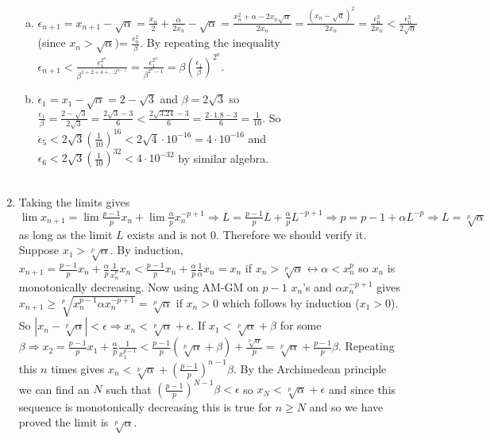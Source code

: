 \documentclass{article}
\begin{document}
\begin{enumerate}
\begin{enumerate}[(a)]
\item $\epsilon_{n+1}=x_{n+1}-\sqrt{\alpha}=\displaystyle\frac{x_n}{2}+\frac{\alpha}{2x_n}-\sqrt{\alpha}=\frac{x_n^2+\alpha-2x_n\sqrt{\alpha}}{2x_n}=\frac{(x_n-\sqrt{a})^2}{2x_n}=\frac{\epsilon_n^2}{2x_n}<\frac{\epsilon_n^2}{2\sqrt{\alpha}}$ (since $x_n > \sqrt{\alpha}) $= $\displaystyle\frac{\epsilon_n^2}{\beta}$. By repeating the inequality $\epsilon_{n+1} < \displaystyle \frac{\epsilon_1^{2^n}}{\beta^{1+2+4+...2^{n-1}}}=\displaystyle \frac{\epsilon_1^{2^n}}{\beta^{2^n-1}}=\beta\left(\frac{\epsilon_1}{\beta}\right)^{2^n}$.
\item $\epsilon_1 = x_1 - \sqrt{\alpha} = 2 - \sqrt{3}$ and $\beta = 2\sqrt{3}$ so $\displaystyle\frac{\epsilon_1}{\beta}=\frac{2 - \sqrt{3}}{2\sqrt{3}}=\frac{2\sqrt{3}-3}{6}<\frac{2\sqrt{3.24}-3}{6}=\frac{2\cdot 1.8 - 3}{6}=\frac{1}{10}$. So $\epsilon_5 < 2\sqrt{3}\left(\frac{1}{10}\right)^{16}<2\sqrt{4}\cdot 10^{-16}=4\cdot 10^{-16}$ and $\epsilon_6 < 2\sqrt{3}\left(\frac{1}{10}\right)^{32} < 4\cdot 10^{-32}$ by similar algebra.
\\
\\
\end{enumerate}
\setcounter{enumi}{17}
\item Taking the limits gives $\lim x_{n+1} = \lim \frac{p-1}{p} x_n + \lim \frac{\alpha}{p} x_n^{-p+1} \Rightarrow L = \frac{p-1}{p} L + \frac{\alpha}{p} L^{-p+1} \Rightarrow p=p-1+\alpha L^{-p} \Rightarrow L = \sqrt[p]{\alpha}$ as long as the limit $L$ exists and is not $0$. Therefore we should verify it. Suppose $x_1 > \sqrt[p]{\alpha}$. By induction, $x_{n+1} = \frac{p-1}{p} x_n + \frac{\alpha}{p} \frac{1}{x_n^p} x_n < \frac{p-1}{p} x_n + \frac{\alpha}{p} \frac{1}{\alpha} x_n = x_n$ if $x_n > \sqrt[p]{\alpha} \leftrightarrow \alpha < x_n^p$ so $x_n$ is monotonically decreasing. Now using AM-GM on $p-1$ $x_n$'s and $\alpha x_n^{-p+1}$ gives $x_{n+1} \geq \sqrt[p]{x_n^{p-1}\alpha x_n^{-p+1}}=\sqrt[p]{\alpha}$ if $x_n > 0$ which follows by induction ($x_1 > 0$). So $|x_n - \sqrt[p]{\alpha}| < \epsilon \Rightarrow x_n < \sqrt[p]{\alpha} + \epsilon$. If $x_1 < \sqrt[p]{\alpha} + \beta$ for some $\beta \Rightarrow x_2 = \frac{p-1}{p} x_1 + \frac{\alpha}{p} \frac{1}{x_1^{p-1}} < \frac{p-1}{p}(\sqrt[p]{\alpha} + \beta) +\frac{\sqrt[p]{\alpha}}{p} = \sqrt[p]{\alpha} + \frac{p-1}{p}\beta$. Repeating this $n$ times gives $x_n < \sqrt[p]{\alpha}+(\frac{p-1}{p})^{n-1}\beta$. By the Archimedean principle we can find an $N$ such that $(\frac{p-1}{p})^{N-1}\beta < \epsilon$ so $x_N < \sqrt[p]{\alpha} + \epsilon$ and since this sequence is monotonically decreasing this is true for $n\geq N$ and so we have proved the limit is $\sqrt[p]{\alpha}$.
\end{enumerate}
\end{document}
